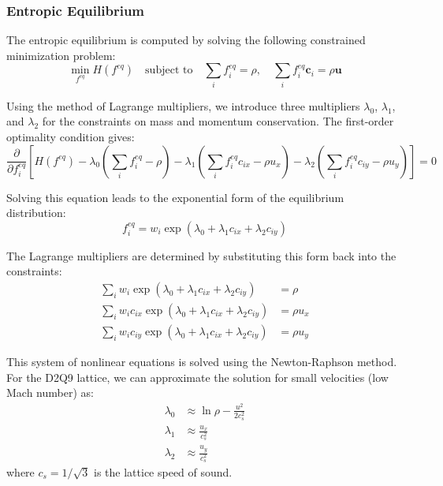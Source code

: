 \documentclass[12pt,a4paper]{article}
\begin{document}
\subsubsection{Entropic Equilibrium}
The entropic equilibrium is computed by solving the following constrained minimization problem:
\begin{equation}
\min_{f^{eq}} H(f^{eq}) \quad \text{subject to} \quad \sum_i f^{eq}_i = \rho, \quad \sum_i f^{eq}_i \mathbf{c}_i = \rho \mathbf{u}
\end{equation}

Using the method of Lagrange multipliers, we introduce three multipliers $\lambda_0$, $\lambda_1$, and $\lambda_2$ for the constraints on mass and momentum conservation. The first-order optimality condition gives:
\begin{equation}
\frac{\partial}{\partial f_i^{eq}}\left[H(f^{eq}) - \lambda_0\left(\sum_i f_i^{eq} - \rho\right) - \lambda_1\left(\sum_i f_i^{eq}c_{ix} - \rho u_x\right) - \lambda_2\left(\sum_i f_i^{eq}c_{iy} - \rho u_y\right)\right] = 0
\end{equation}

Solving this equation leads to the exponential form of the equilibrium distribution:
\begin{equation}
f^{eq}_i = w_i \exp(\lambda_0 + \lambda_1 c_{ix} + \lambda_2 c_{iy})
\end{equation}

The Lagrange multipliers are determined by substituting this form back into the constraints:
\begin{align}
\sum_i w_i \exp(\lambda_0 + \lambda_1 c_{ix} + \lambda_2 c_{iy}) &= \rho\\
\sum_i w_i c_{ix} \exp(\lambda_0 + \lambda_1 c_{ix} + \lambda_2 c_{iy}) &= \rho u_x\\
\sum_i w_i c_{iy} \exp(\lambda_0 + \lambda_1 c_{ix} + \lambda_2 c_{iy}) &= \rho u_y
\end{align}

This system of nonlinear equations is solved using the Newton-Raphson method. For the D2Q9 lattice, we can approximate the solution for small velocities (low Mach number) as:
\begin{align}
\lambda_0 &\approx \ln\rho - \frac{u^2}{2c_s^2}\\
\lambda_1 &\approx \frac{u_x}{c_s^2}\\
\lambda_2 &\approx \frac{u_y}{c_s^2}
\end{align}
where $c_s = 1/\sqrt{3}$ is the lattice speed of sound.
\end{document}
